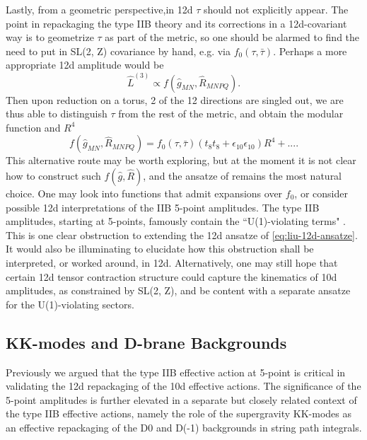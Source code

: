 Lastly, from a geometric perspective,in 12d $\tau$ should not explicitly appear. 
The point in repackaging the type IIB theory and its corrections in a 12d-covariant way is to geometrize $\tau$ as part of the metric, so one should be alarmed to find the need to put in SL(2, Z) covariance by hand, e.g. via $f_0(\tau,\bar\tau)$.
Perhaps a more appropriate 12d amplitude would be
\begin{equation}
\hat{L}^{(3)} \propto f(\hat{g}_{MN},\hat{R}_{MNPQ}).
\end{equation}
Then upon reduction on a torus, 2 of the 12 directions are singled out, we are thus able to distinguish $\tau$ from the rest of the metric, and obtain the modular function and $R^4$
\begin{equation}
f(\hat{g}_{MN},\hat{R}_{MNPQ})
= f_0(\tau,\bar\tau)(t_8t_8 + \epsilon_{10}\epsilon_{10})R^4 + ....
\end{equation}
This alternative route may be worth exploring, but at the moment it is not clear how to construct such $f(\hat{g},\hat{R})$, and the ansatze of \cite{Minasian:2015bxa} remains the most natural choice.
One may look into functions that admit expansions over $f_0$, or consider possible 12d interpretations of the IIB 5-point amplitudes.
The type IIB amplitudes, starting at 5-points, famously contain the ``U(1)-violating terms" \cite{Liu:2025uqu}. This is one clear obstruction to extending the 12d ansatze of \eqref{eq:liu-12d-ansatze}.
It would also be illuminating to elucidate how this obstruction shall be interpreted, or worked around, in 12d.
Alternatively, one may still hope that certain 12d tensor contraction structure could capture the kinematics of 10d amplitudes, as constrained by SL(2, Z), and be content with a separate ansatze for the U(1)-violating sectors.





\subsection{KK-modes and D-brane Backgrounds}
Previously we argued that the type IIB effective action at 5-point is critical in validating the 12d repackaging of the 10d effective actions.
The significance of the 5-point amplitudes is further elevated in a separate but closely related context of the type IIB effective actions, namely the role of the supergravity KK-modes as an effective repackaging of the D0 and D(-1) backgrounds in string path integrals. 

